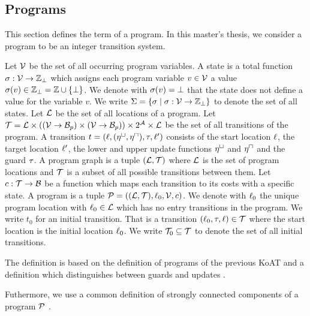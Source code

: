 \subsection{Programs}

This section defines the term of a program.
In this master's thesis, we consider a program to be an integer transition system.


\begin{definition}[Program] 
  Let $\mathcal{V}$ be the set of all occurring program variables.
  A state is a total function $\sigma: \mathcal{V} \rightarrow \mathbb{Z}_\bot$ which assigns each program variable $v \in \mathcal{V}$ a value $\sigma(v) \in \mathbb{Z}_\bot = \mathbb{Z} \cup \lbrace \bot \rbrace$.
  We denote with $\sigma(v) = \bot$ that the state does not define a value for the variable $v$.
  We write $\Sigma = \lbrace  \sigma \mid \sigma: \mathcal{V} \rightarrow \mathbb{Z}_\bot \rbrace$ to denote the set of all states.
  Let $\mathcal{L}$ be the set of all locations of a program.
  Let $\mathcal{T} = \mathcal{L} \times ((\mathcal{V} \rightarrow \mathcal{B}_p) \times (\mathcal{V} \rightarrow \mathcal{B}_p)) \times 2^{\mathcal{A}} \times \mathcal{L}$ be the set of all transitions of the program.
  A transition $t = (\ell, (\eta^\sqcup, \eta^\sqcap), \tau, \ell')$ consists of the start location $\ell$, the target location $\ell'$, the lower and upper update functions $\eta^\sqcup$ and $\eta^\sqcap$ and the guard $\tau$. 
  A program graph is a tuple $(\mathcal{L}, \mathcal{T})$ where $\mathcal{L}$ is the set of program locations and $\mathcal{T}$ is a subset of all possible transitions between them.
  Let $c: \mathcal{T} \rightarrow \mathcal{B}$ be a function which maps each transition to its costs with a specific state.
  A program is a tuple $\mathcal{P} = ((\mathcal{L}, \mathcal{T}), \ell_0, \mathcal{V}, c)$.
  We denote with $\ell_0$ the unique program location with $\ell_0 \in \mathcal{L}$ which has no entry transitions in the program.
  We write $t_0$ for an initial transition. That is a transition $(\ell_0, \tau, \ell) \in \mathcal{T}$ where the start location is the initial location $\ell_0$.
  We write $\mathcal{T}_0 \subseteq \mathcal{T}$ to denote the set of all initial transitions.
\end{definition}
The definition is based on the definition of programs of the previous KoAT \cite{koat} and a definition which distinguishes between guards and updates \cite{lowerruntime}.

Futhermore, we use a common definition of strongly connected components of a program $\mathcal{P}$ \cite{sccs}.

